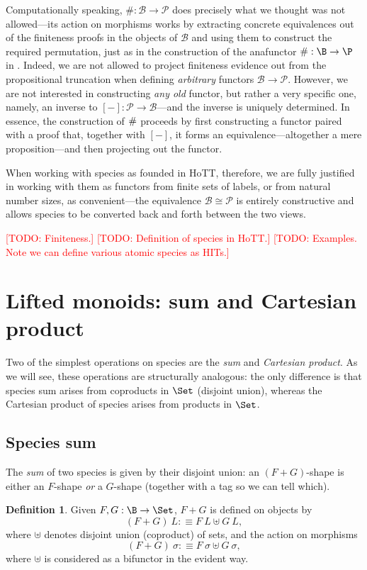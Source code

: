 \documentclass[preprint,authoryear]{sigplanconf}
\newcommand{\pref}[1]{\prettyref{#1}}
\newcommand{\todo}[1]{\textcolor{red}{[TODO: #1]}}
\newcommand{\todo}[1]{}
\newcommand{\mcal}[1]{\ensuremath{\mathcal{#1}}}
\let\oldequiv\equiv
\newcommand{\jeq}{\oldequiv}          %
\newcommand{\defeq}{\mathrel{:\jeq}}  %
\renewcommand{\equiv}{\simeq}         %
\newcommand{\iso}{\cong}              %
\theoremstyle{definition}
\newtheorem{defn}[thm]{Definition}
\theoremstyle{remark}
\newcommand{\cons}[1]{\ensuremath{\mathsf{#1}}}
\newcommand{\inl}{\cons{inl}}
\newcommand{\inr}{\cons{inr}}
\newcommand{\sizesymb}{\#}
\newcommand{\size}[1]{\ensuremath{\sizesymb#1}}
\newcommand{\BT}{\mcal{B}}
\newcommand{\PT}{\mcal{P}}
\newcommand{\fin}[1]{\ensuremath{[#1]}}
\begin{document}
Computationally speaking, $\size : \BT \to \PT$ does precisely what we
thought was not allowed---its action on morphisms works by extracting
concrete equivalences out of the finiteness proofs in the objects of
$\BT$ and using them to construct the required permutation, just as in
the construction of the anafunctor $\size : \B \to \P$ in
\pref{sec:finiteness-sets}.  Indeed, we are not allowed to project
finiteness evidence out from the propositional truncation when
defining \emph{arbitrary} functors $\BT \to \PT$.  However, we are not
interested in constructing \emph{any old} functor, but rather a very
specific one, namely, an inverse to $\fin - : \PT \to \BT$---and the
inverse is uniquely determined.  In essence, the construction of
$\size$ proceeds by first constructing a functor paired with a proof
that, together with $\fin -$, it forms an equivalence---altogether a
mere proposition---and then projecting out the functor.

When working with species as founded in HoTT, therefore, we are fully
justified in working with them as functors from finite sets of labels,
or from natural number sizes, as convenient---the equivalence $\BT
\iso \PT$ is entirely constructive and allows species to be
converted back and forth between the two views.

\todo{Finiteness.}
\todo{Definition of species in HoTT.}
\todo{Examples. Note we can define various atomic species as HITs.}

\section{Lifted monoids: sum and Cartesian product}
\label{sec:lifted}

Two of the simplest operations on species are the \emph{sum} and
\emph{Cartesian product}.  As we will see, these operations are
structurally analogous: the only difference is that species sum arises
from coproducts in $\Set$ (disjoint union), whereas the Cartesian
product of species arises from products in $\Set$.

\subsection{Species sum}

The \emph{sum} of two species is given by their disjoint
union: an $(F + G)$-shape is either an $F$-shape \emph{or} a
$G$-shape (together with a tag so we can tell which).

\begin{defn}
  Given $F, G : \B \to \Set$, $F + G$ is
  defined on objects by \[ (F + G)\ L \defeq F\ L \uplus G\ L, \] where 
  $\uplus$ denotes disjoint union (coproduct) of
  sets, and the action on morphisms \[ (F + G)\
  \sigma \defeq F\ \sigma \uplus G\ \sigma, \] where $\uplus$ is
  considered as a bifunctor in the evident way. 
\end{defn}
\end{document}

